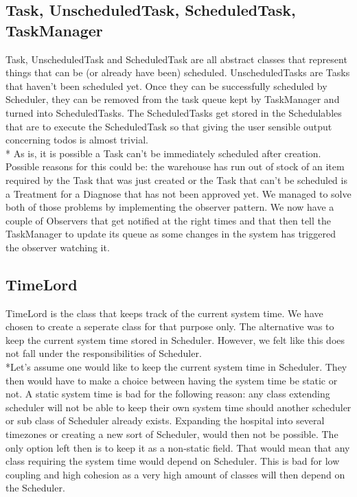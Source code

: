 \documentclass[12pt]{article}
\begin{document}
\subsection{Task, UnscheduledTask, ScheduledTask, TaskManager}
Task, UnscheduledTask and ScheduledTask are all abstract classes that represent things that can be (or already have been) scheduled. UnscheduledTasks are Tasks that haven't been scheduled yet. Once they can be successfully scheduled by Scheduler, they can be removed from the task queue kept by TaskManager and turned into ScheduledTasks. The ScheduledTasks get stored in the Schedulables that are to execute the ScheduledTask so that giving the user sensible output concerning todos is almost trivial.
\\* As is, it is possible a Task can't be immediately scheduled after creation. Possible reasons for this could be: the warehouse has run out of stock of an item required by the Task that was just created or the Task that can't be scheduled is a Treatment for a Diagnose that has not been approved yet. We managed to solve both of those problems by implementing the observer pattern. We now have a couple of Observers that get notified at the right times and that then tell the TaskManager to update its queue as some changes in the system has triggered the observer watching it.

\subsection{TimeLord}
TimeLord is the class that keeps track of the current system time. We have chosen to create a seperate class for that purpose only. The alternative was to keep the current system time stored in Scheduler. However, we felt like this does not fall under the responsibilities of Scheduler. 
\\*Let's assume one would like to keep the current system time in Scheduler. They then would have to make a choice between having the system time be static or not. A static system time is bad for the following reason: any class extending scheduler will not be able to keep their own system time should another scheduler or sub class of Scheduler already exists. Expanding the hospital into several timezones or creating a new sort of Scheduler, would then not be possible. The only option left then is to keep it as a non-static field. That would mean that any class requiring the system time would depend on Scheduler. This is bad for low coupling and high cohesion as a very high amount of classes will then depend on the Scheduler.
\end{document}
